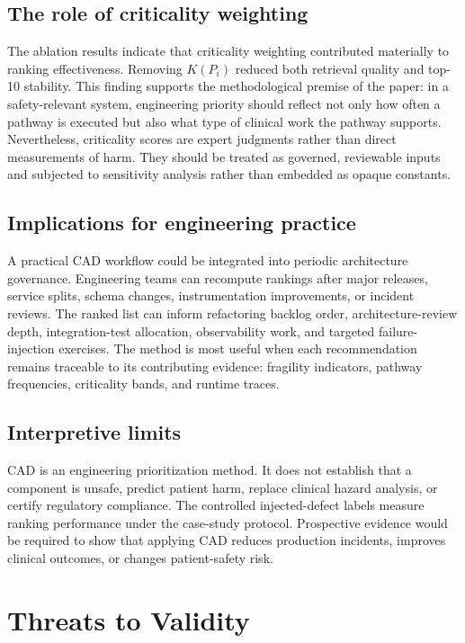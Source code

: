 \documentclass[english,preprint]{elsarticle}
\newcommand{\CAD}{\textsc{CAD}\xspace}
\begin{document}
\subsection{The role of criticality weighting}

The ablation results indicate that criticality weighting contributed materially to ranking effectiveness. Removing $K(P_i)$ reduced both retrieval quality and top-10 stability. This finding supports the methodological premise of the paper: in a safety-relevant system, engineering priority should reflect not only how often a pathway is executed but also what type of clinical work the pathway supports. Nevertheless, criticality scores are expert judgments rather than direct measurements of harm. They should be treated as governed, reviewable inputs and subjected to sensitivity analysis rather than embedded as opaque constants.

\subsection{Implications for engineering practice}

A practical \CAD workflow could be integrated into periodic architecture governance. Engineering teams can recompute rankings after major releases, service splits, schema changes, instrumentation improvements, or incident reviews. The ranked list can inform refactoring backlog order, architecture-review depth, integration-test allocation, observability work, and targeted failure-injection exercises. The method is most useful when each recommendation remains traceable to its contributing evidence: fragility indicators, pathway frequencies, criticality bands, and runtime traces.

\subsection{Interpretive limits}

\CAD is an engineering prioritization method. It does not establish that a component is unsafe, predict patient harm, replace clinical hazard analysis, or certify regulatory compliance. The controlled injected-defect labels measure ranking performance under the case-study protocol. Prospective evidence would be required to show that applying \CAD reduces production incidents, improves clinical outcomes, or changes patient-safety risk.

\section{Threats to Validity}\label{sec:threats}
\end{document}
